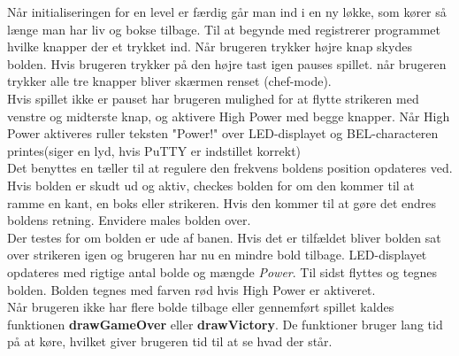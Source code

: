 Når initialiseringen for en level er færdig går man ind i en ny løkke, som kører så længe man har liv og bokse tilbage. Til at begynde med registrerer programmet hvilke knapper der et trykket ind. Når brugeren trykker højre knap skydes bolden.  Hvis brugeren trykker på den højre tast igen pauses spillet. når brugeren trykker alle tre knapper bliver skærmen renset (chef-mode).\\
Hvis spillet ikke er pauset har brugeren mulighed for at flytte strikeren med venstre og midterste knap, og aktivere High Power med begge knapper. Når High Power aktiveres ruller teksten "Power!" over LED-displayet og BEL-characteren printes(siger en lyd, hvis PuTTY er indstillet korrekt)\\
Det benyttes en tæller til at regulere den frekvens boldens position opdateres ved. Hvis bolden er skudt ud og aktiv, checkes bolden for om den kommer til at ramme en kant, en boks eller strikeren. Hvis den kommer til at gøre det endres boldens retning. Envidere males bolden over.\\
Der testes for om bolden er ude af banen. Hvis det er tilfældet bliver bolden sat over strikeren igen og brugeren har nu en mindre bold tilbage. LED-displayet opdateres med rigtige antal bolde og mængde \textit{Power}. Til sidst flyttes og tegnes bolden. Bolden tegnes med farven rød hvis High Power er aktiveret. \\
Når brugeren ikke har flere bolde  tilbage eller gennemført spillet kaldes funktionen \textbf{drawGameOver} eller \textbf{drawVictory}. De funktioner bruger lang tid på at køre, hvilket giver brugeren tid til at se hvad der står.
